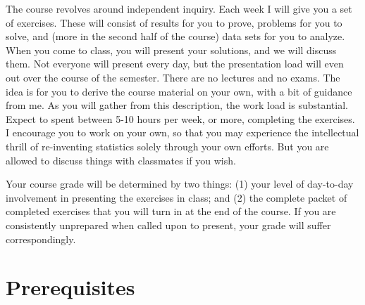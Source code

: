 \documentclass{mynotes}
\begin{document}
The course revolves around independent inquiry.  Each week I will give you a set of exercises.  These will consist of results for you to prove, problems for you to solve, and (more in the second half of the course) data sets for you to analyze.  When you come to class, you will present your solutions, and we will discuss them.  Not everyone will present every day, but the presentation load will even out over the course of the semester.  There are no lectures and no exams.  The idea is for you to derive the course material on your own, with a bit of guidance from me.  As you will gather from this description, the work load is substantial.  Expect to spent between 5-10 hours per week, or more, completing the exercises.  I encourage you to work on your own, so that you may experience the intellectual thrill of re-inventing statistics solely through your own efforts.  But you are allowed to discuss things with classmates if you wish.

Your course grade will be determined by two things: (1) your level of day-to-day involvement in presenting the exercises in class; and (2) the complete packet of completed exercises that you will turn in at the end of the course.  If you are consistently unprepared when called upon to present, your grade will suffer correspondingly.

\section{Prerequisites}
\end{document}
